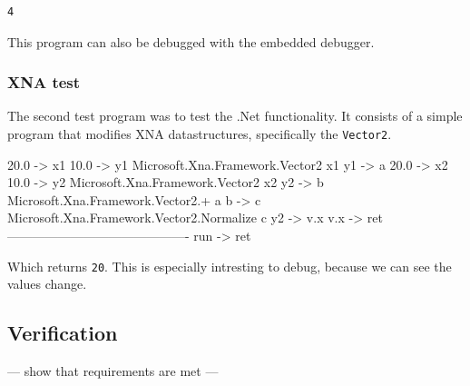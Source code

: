 \begin{lstlisting}
4
\end{lstlisting}

This program can also be debugged with the embedded debugger.

\subsubsection{XNA test}
The second test program was to test the .Net functionality.
It consists of a simple program that modifies XNA datastructures, specifically the \verb|Vector2|.

\begin{MC}
20.0 -> x1
10.0 -> y1
Microsoft.Xna.Framework.Vector2 x1 y1 -> a
20.0 -> x2
10.0 -> y2
Microsoft.Xna.Framework.Vector2 x2 y2 -> b
Microsoft.Xna.Framework.Vector2.+ a b -> c
Microsoft.Xna.Framework.Vector2.Normalize c
y2 -> v.x 
v.x -> ret
-------------------------------------------
run -> ret
\end{MC}

Which returns \verb|20|.
This is especially intresting to debug, because we can see the values change.


\subsection{Verification}
--- show that requirements are met ---

